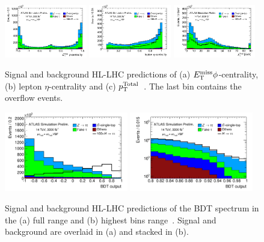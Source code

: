 \begin{figure}[!htpb]
  \centering
  \includegraphics[width=0.32\textwidth]{figures/ATL-PHYS-PUB-2014-018/fig_05a}
  \includegraphics[width=0.32\textwidth]{figures/ATL-PHYS-PUB-2014-018/fig_05b}
  \includegraphics[width=0.32\textwidth]{figures/ATL-PHYS-PUB-2014-018/fig_05c}
  \caption{Signal and background HL-LHC predictions of (a) $E_{\mathrm{T}}^{\mathrm{miss}} \phi$-centrality, (b) $\text{lepton}$ $\eta$-centrality and (c) $p_{\mathrm{T}}^\text{Total}$~\cite{ATL-PHYS-PUB-2014-018}. The last bin contains the overflow events.}
  \label{fig:prospects-hllhc-other}
\end{figure}

\begin{figure}[!htpb]
  \centering
  \includegraphics[width=0.48\textwidth]{figures/ATL-PHYS-PUB-2014-018/fig_06a}
  \includegraphics[width=0.48\textwidth]{figures/ATL-PHYS-PUB-2014-018/fig_06b}
  \caption{Signal and background HL-LHC predictions of the BDT spectrum in the (a) full range and (b) highest bins range~\cite{ATL-PHYS-PUB-2014-018}. Signal and background are overlaid in (a) and stacked in (b).}
  \label{fig:prospects-hllhc-bdts}
\end{figure}

